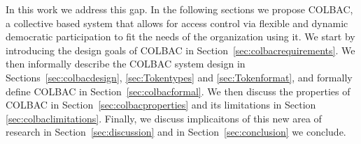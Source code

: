 In this work we address this gap. In the following sections we propose COLBAC, a
collective based system that allows for access control via flexible and dynamic
democratic participation to fit the needs of the organization using it. We start
by introducing the design goals of COLBAC in
Section~\ref{sec:colbacrequirements}. We then informally describe the COLBAC
system design in Sections~\ref{sec:colbacdesign}, \ref{sec:Tokentypes} and 
\ref{sec:Tokenformat}, and formally define COLBAC in
Section~\ref{sec:colbacformal}. We then discuss the properties of COLBAC in
Section~\ref{sec:colbacproperties} and its limitations in Section
\ref{sec:colbaclimitations}. Finally, we discuss implicaitons of this new area
of research in Section~\ref{sec:discussion} and in Section~\ref{sec:conclusion}
we conclude.
%
%
%

